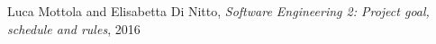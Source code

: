 	Luca Mottola and Elisabetta Di Nitto, \emph{Software Engineering 2: Project goal, schedule and rules}, 2016
	